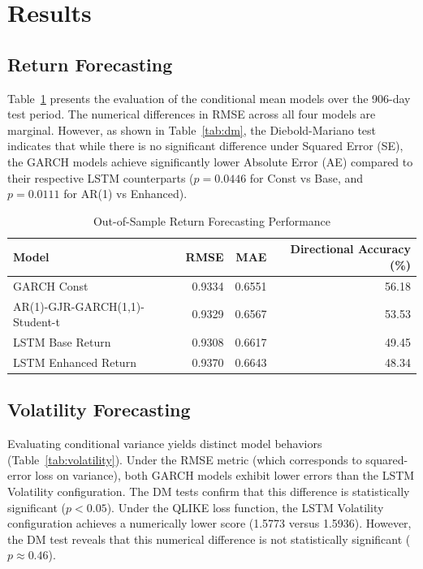 \documentclass[11pt,a4paper]{article}
\begin{document}
\section{Results}

\subsection{Return Forecasting}
Table~\ref{tab:returns} presents the evaluation of the conditional mean models over the 906-day test period. The numerical differences in RMSE across all four models are marginal. However, as shown in Table~\ref{tab:dm}, the Diebold-Mariano test indicates that while there is no significant difference under Squared Error (SE), the GARCH models achieve significantly lower Absolute Error (AE) compared to their respective LSTM counterparts ($p=0.0446$ for Const vs Base, and $p=0.0111$ for AR(1) vs Enhanced).

\begin{table}[H]
\centering
\caption{Out-of-Sample Return Forecasting Performance}
\label{tab:returns}
\begin{tabular}{lrrr}
\toprule
Model & RMSE & MAE & Directional Accuracy (\%) \\
\midrule
GARCH Const & 0.9334 & 0.6551 & 56.18 \\
AR(1)-GJR-GARCH(1,1)-Student-t & 0.9329 & 0.6567 & 53.53 \\
LSTM Base Return & 0.9308 & 0.6617 & 49.45 \\
LSTM Enhanced Return & 0.9370 & 0.6643 & 48.34 \\
\bottomrule
\end{tabular}
\end{table}

\subsection{Volatility Forecasting}
Evaluating conditional variance yields distinct model behaviors (Table~\ref{tab:volatility}). Under the RMSE metric (which corresponds to squared-error loss on variance), both GARCH models exhibit lower errors than the LSTM Volatility configuration. The DM tests confirm that this difference is statistically significant ($p < 0.05$). Under the QLIKE loss function, the LSTM Volatility configuration achieves a numerically lower score (1.5773 versus 1.5936). However, the DM test reveals that this numerical difference is not statistically significant ($p \approx 0.46$).
\end{document}
